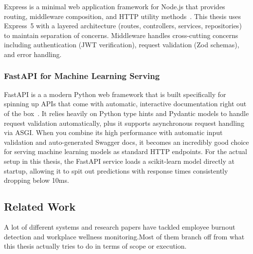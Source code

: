 \documentclass[12pt,a4paper]{article}
\begin{document}
Express is a minimal web application framework for Node.js that provides
routing, middleware composition, and HTTP utility
methods~\cite{express2024}. This thesis uses Express~5 with a layered
architecture (routes, controllers, services, repositories) to maintain
separation of concerns. Middleware handles cross-cutting concerns including
authentication (JWT verification), request validation (Zod schemas), and
error handling.

\subsubsection{FastAPI for Machine Learning Serving}

FastAPI is a a modern Python web framework that is built specifically for spinning up APIs that come with automatic, interactive documentation right out of the box~\cite{fastapi2024}. It relies heavily on Python type hints and Pydantic models to handle request validation automatically, plus it supports asynchronous request handling via ASGI. When you combine its high performance with automatic input validation and auto-generated Swagger docs, it becomes an incredibly good choice for serving machine learning models as standard HTTP endpoints. For the actual setup in this thesis, the FastAPI service loads a scikit-learn model directly at startup, allowing it to spit out predictions with response times consistently dropping below 10ms.

\subsection{Related Work}

A lot of different systems and research papers have tackled employee burnout detection and workplace wellness monitoring.Most of them branch off from what this thesis actually tries to do in terms of scope or execution.
\end{document}
